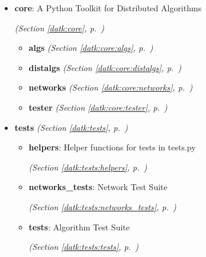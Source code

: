 \begin{itemize}
\setlength{\parskip}{0ex}
\item \textbf{core}: A Python Toolkit for Distributed Algorithms



  \textit{(Section \ref{datk:core}, p.~\pageref{datk:core})}

  \begin{itemize}
\setlength{\parskip}{0ex}
    \item \textbf{algs}
  \textit{(Section \ref{datk:core:algs}, p.~\pageref{datk:core:algs})}

    \item \textbf{distalgs}
  \textit{(Section \ref{datk:core:distalgs}, p.~\pageref{datk:core:distalgs})}

    \item \textbf{networks}
  \textit{(Section \ref{datk:core:networks}, p.~\pageref{datk:core:networks})}

    \item \textbf{tester}
  \textit{(Section \ref{datk:core:tester}, p.~\pageref{datk:core:tester})}

  \end{itemize}
\item \textbf{tests}
  \textit{(Section \ref{datk:tests}, p.~\pageref{datk:tests})}

  \begin{itemize}
\setlength{\parskip}{0ex}
    \item \textbf{helpers}: Helper functions for tests in tests.py



  \textit{(Section \ref{datk:tests:helpers}, p.~\pageref{datk:tests:helpers})}

    \item \textbf{networks\_tests}: Network Test Suite



  \textit{(Section \ref{datk:tests:networks_tests}, p.~\pageref{datk:tests:networks_tests})}

    \item \textbf{tests}: Algorithm Test Suite



  \textit{(Section \ref{datk:tests:tests}, p.~\pageref{datk:tests:tests})}

  \end{itemize}
\end{itemize}



